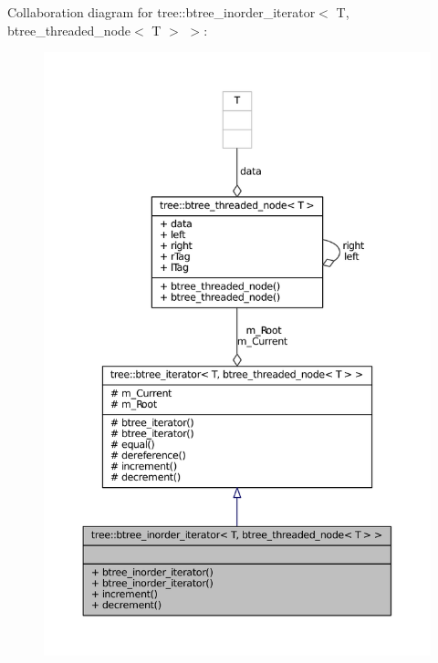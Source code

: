 \-Collaboration diagram for tree\-:\-:btree\-\_\-inorder\-\_\-iterator$<$ \-T, btree\-\_\-threaded\-\_\-node$<$ \-T $>$ $>$\-:
\nopagebreak
\begin{figure}[H]
\begin{center}
\leavevmode
\includegraphics[width=350pt]{classtree_1_1btree__inorder__iterator_3_01T_00_01btree__threaded__node_3_01T_01_4_01_4__coll__graph}
\end{center}
\end{figure}

